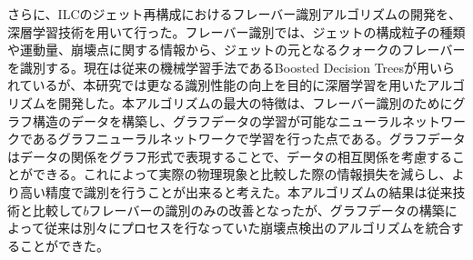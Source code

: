 さらに、ILCのジェット再構成におけるフレーバー識別アルゴリズムの開発を、深層学習技術を用いて行った。フレーバー識別では、ジェットの構成粒子の種類や運動量、崩壊点に関する情報から、ジェットの元となるクォークのフレーバーを識別する。現在は従来の機械学習手法であるBoosted Decision Treesが用いられているが、本研究では更なる識別性能の向上を目的に深層学習を用いたアルゴリズムを開発した。本アルゴリズムの最大の特徴は、フレーバー識別のためにグラフ構造のデータを構築し、グラフデータの学習が可能なニューラルネットワークであるグラフニューラルネットワークで学習を行った点である。グラフデータはデータの関係をグラフ形式で表現することで、データの相互関係を考慮することができる。これによって実際の物理現象と比較した際の情報損失を減らし、より高い精度で識別を行うことが出来ると考えた。本アルゴリズムの結果は従来技術と比較して$b$フレーバーの識別のみの改善となったが、グラフデータの構築によって従来は別々にプロセスを行なっていた崩壊点検出のアルゴリズムを統合することができた。%

